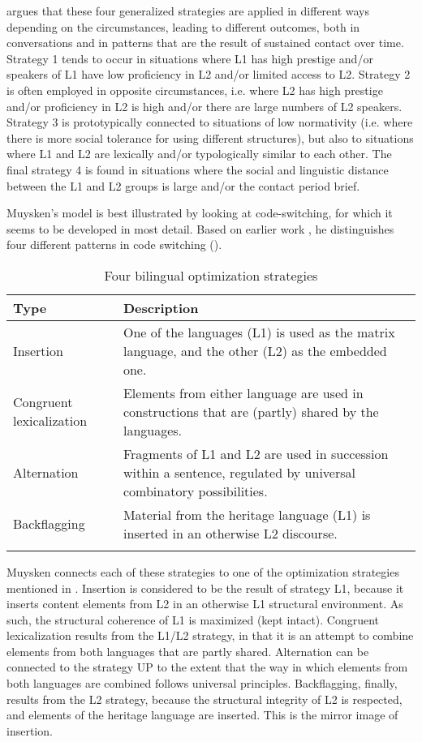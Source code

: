 \documentclass[output=paper]{langscibook}
\begin{document}
\textcite{muysken2013language} argues that these four generalized strategies are applied in different ways depending on the circumstances, leading to different outcomes, both in conversations and in patterns that are the result of sustained contact over time. Strategy 1 tends to occur in situations where L1 has high prestige and/or speakers of L1 have low proficiency in L2 and/or limited access to L2. Strategy 2 is often employed in opposite circumstances, i.e. where L2 has high prestige and/or proficiency in L2 is high and/or there are large numbers of L2 speakers. Strategy 3 is prototypically connected to situations of low normativity (i.e. where there is more social tolerance for using different structures), but also to situations where L1 and L2 are lexically and/or typologically similar to each other. The final strategy 4 is found in situations where the social and linguistic distance between the L1 and L2 groups is large and/or the contact period brief.

Muysken's model is best illustrated by looking at code-switching, for which it seems to be developed in most detail. Based on earlier work \parencite{muysken2000}, he distinguishes four different patterns in code switching ().

\begin{table}
\caption{Four bilingual optimization strategies\label{tab-muysken_CS}}  
 \begin{tabularx}{\textwidth}{lX} 
  \lsptoprule
 Type & Description \\ 
  \midrule
  {Insertion} & One of the languages (L1) is used as the matrix language, and the other (L2) as the embedded one.\\
  {Congruent lexicalization} & Elements from either language are used in constructions that are (partly) shared by the languages.\\
  {Alternation} & Fragments of L1 and L2 are used in succession within a sentence, regulated by universal combinatory possibilities.\\
  {Backflagging} & Material from the heritage language (L1) is inserted in an otherwise L2 discourse.\\
\lspbottomrule
 \end{tabularx}
\end{table}

Muysken connects each of these strategies to one of the optimization strategies mentioned in . Insertion is considered to be the result of strategy L1, because it inserts content elements from L2 in an otherwise L1 structural environment. As such, the structural coherence of L1 is maximized (kept intact). Congruent lexicalization results from the L1/L2 strategy, in that it is an attempt to combine elements from both languages that are partly shared. Alternation can be connected to the strategy UP to the extent that the way in which elements from both languages are combined follows universal principles. Backflagging, finally, results from the L2 strategy, because the structural integrity of L2 is respected, and elements of the heritage language are inserted. This is the mirror image of insertion.
\end{document}
